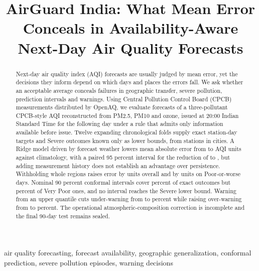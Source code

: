 \documentclass[conference,a4paper]{IEEEtran}
\begin{document}
\title{AirGuard India: What Mean Error Conceals in Availability-Aware Next-Day Air Quality Forecasts}

\author{
}

\maketitle

\begin{abstract}
Next-day air quality index (AQI) forecasts are usually judged by mean error, yet the decisions they inform depend on which days and places the errors fall. We ask whether an acceptable average conceals failures in geographic transfer, severe pollution, prediction intervals and warnings. Using Central Pollution Control Board (CPCB) measurements distributed by OpenAQ, we evaluate forecasts of a three-pollutant CPCB-style AQI reconstructed from PM2.5, PM10 and ozone, issued at 20:00 Indian Standard Time for the following day under a rule that admits only information available before issue. Twelve expanding chronological folds supply \nExact{} exact station-day targets and \nSevere{} Severe outcomes known only as lower bounds, from \nStations{} stations in \nCities{} cities. A Ridge model driven by forecast weather lowers mean absolute error from \maeClim{} to \maeWx{} AQI units against climatology, with a paired 95 percent interval for the reduction of \dWxClimHiAbs{} to \dWxClimLoAbs{}, but adding measurement history does not establish an advantage over persistence. Withholding whole regions raises error by \spRegion{} units overall and by \spRegionHigh{} units on Poor-or-worse days. Nominal 90 percent conformal intervals cover \covNinety{} percent of exact outcomes but \covSplitVeryPoor{} percent of Very Poor ones, and no interval reaches the Severe lower bound. Warning from an upper quantile cuts under-warning from \underPzero{} to \underPtwo{} percent while raising over-warning from \overPzero{} to \overPtwo{} percent. The operational atmospheric-composition correction is incomplete and the final 90-day test remains sealed.
\end{abstract}

\begin{IEEEkeywords}
air quality forecasting, forecast availability, geographic generalization, conformal prediction, severe pollution episodes, warning decisions
\end{IEEEkeywords}
\end{document}
